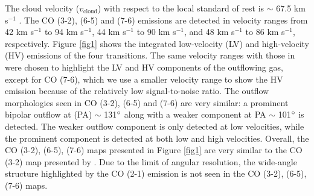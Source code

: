 The cloud velocity ($v_{\mathrm{cloud}}$) with respect to the local standard of rest is $\sim$ 67.5 km s$^{-1}$ \citep{2003A&A...412..175K}. The CO (3-2), (6-5) and (7-6) emissions are detected in velocity ranges from 42 km s$^{-1}$ to 94 km s$^{-1}$, 44 km s$^{-1}$ to 90 km s$^{-1}$, and 48 km s$^{-1}$ to 86 km s$^{-1}$, respectively. Figure \ref{fig1} shows the integrated low-velocity (LV) and high-velocity (HV) emissions of the four transitions. The same velocity ranges with those in \citet{2009ApJ...696...66Q} were chosen to highlight the LV and HV components of the outflowing gas, except for CO (7-6), which we use a smaller velocity range to show the HV emission because of the relatively low signal-to-noise ratio. The outflow morphologies seen in CO (3-2), (6-5) and (7-6) are very similar: a prominent bipolar outflow at (PA) $\sim$ 131${\mbox{$^\circ$}}$ along with a weaker component at PA $\sim$ 101${\mbox{$^\circ$}}$ is detected. The weaker outflow component is only detected at low velocities, while the prominent component is detected at both low and high velocities. Overall, the CO (3-2), (6-5), (7-6) maps presented in Figure \ref{fig1} are very similar to the CO (3-2) map presented by \citet{2003A&A...412..175K}. Due to the limit of angular resolution, the wide-angle structure highlighted by the CO (2-1) emission is not seen in the CO (3-2), (6-5), (7-6) maps.

